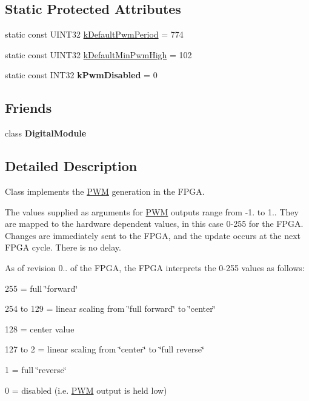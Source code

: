 \subsection*{\-Static \-Protected \-Attributes}
\begin{DoxyCompactItemize}
\item 
static const \-U\-I\-N\-T32 \hyperlink{classPWM_ad76e35266df11ca46f9792492671379a}{k\-Default\-Pwm\-Period} = 774
\item 
static const \-U\-I\-N\-T32 \hyperlink{classPWM_a6d481a094dc4d1df83cfd77b2d6bbf06}{k\-Default\-Min\-Pwm\-High} = 102
\item 
\hypertarget{classPWM_a1128d7b7ad8cb6a4d3bb49ef4c08fbfa}{static const \-I\-N\-T32 {\bfseries k\-Pwm\-Disabled} = 0}\label{classPWM_a1128d7b7ad8cb6a4d3bb49ef4c08fbfa}

\end{DoxyCompactItemize}
\subsection*{\-Friends}
\begin{DoxyCompactItemize}
\item 
\hypertarget{classPWM_aa15053da4e6cbe2d051a32116bcfbf2b}{class {\bfseries \-Digital\-Module}}\label{classPWM_aa15053da4e6cbe2d051a32116bcfbf2b}

\end{DoxyCompactItemize}


\subsection{\-Detailed \-Description}
\-Class implements the \hyperlink{classPWM}{\-P\-W\-M} generation in the \-F\-P\-G\-A.

\-The values supplied as arguments for \hyperlink{classPWM}{\-P\-W\-M} outputs range from -\/1. to 1.. \-They are mapped to the hardware dependent values, in this case 0-\/255 for the \-F\-P\-G\-A. \-Changes are immediately sent to the \-F\-P\-G\-A, and the update occurs at the next \-F\-P\-G\-A cycle. \-There is no delay.

\-As of revision 0.. of the \-F\-P\-G\-A, the \-F\-P\-G\-A interprets the 0-\/255 values as follows\-:
\begin{DoxyItemize}
\item 255 = full \char`\"{}forward\char`\"{}
\item 254 to 129 = linear scaling from \char`\"{}full forward\char`\"{} to \char`\"{}center\char`\"{}
\item 128 = center value
\item 127 to 2 = linear scaling from \char`\"{}center\char`\"{} to \char`\"{}full reverse\char`\"{}
\item 1 = full \char`\"{}reverse\char`\"{}
\item 0 = disabled (i.\-e. \hyperlink{classPWM}{\-P\-W\-M} output is held low) 
\end{DoxyItemize}

